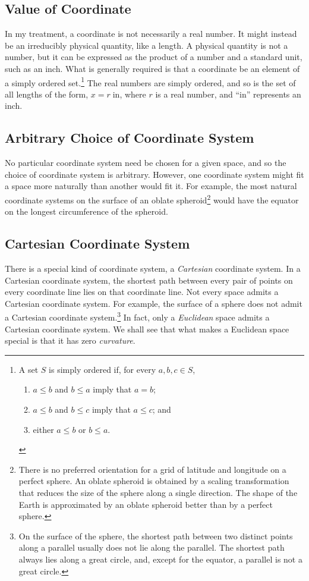 \subsection{Value of Coordinate}

In my treatment, a coordinate is not necessarily a real number.  It might
instead be an irreducibly physical quantity, like a length.  A physical
quantity is not a number, but it can be expressed as the product of a number
and a standard unit, such as an inch.  What is generally required is that a
coordinate be an element of a simply ordered set.\footnote{%
   A set $S$ is simply ordered if, for every $a, b, c \in S$,
   \begin{enumerate}
      \item $a \leq b$ and $b \leq a$ imply that $a = b$;
      \item $a \leq b$ and $b \leq c$ imply that $a \leq c$; and
      \item either $a \leq b$ or $b \leq a$.
   \end{enumerate}%
}
The real numbers are simply ordered, and so is the set of all lengths of the
form, $x = r \; \text{in}$, where $r$ is a real number, and ``$\text{in}$''
represents an inch.

\subsection{Arbitrary Choice of Coordinate System}

No particular coordinate system need be chosen for a given space, and so the
choice of coordinate system is arbitrary.  However, one coordinate system might
fit a space more naturally than another would fit it.  For example, the most
natural coordinate systems on the surface of an oblate
spheroid\footnote[][-0.9in]{%
   There is no preferred orientation for a grid of latitude and longitude on a
   perfect sphere.  An oblate spheroid is obtained by a scaling transformation
   that reduces the size of the sphere along a single direction.  The shape of
   the Earth is approximated by an oblate spheroid better than by a perfect
   sphere.%
}
would have the equator on the longest circumference of the spheroid.

\subsection{Cartesian Coordinate System}

There is a special kind of coordinate system, a \emph{Cartesian} coordinate
system.  In a Cartesian coordinate system, the shortest path between every pair
of points on every coordinate line lies on that coordinate line.  Not every
space admits a Cartesian coordinate system.  For example, the surface of a
sphere does not admit a Cartesian coordinate system.\footnote{%
   On the surface of the sphere, the shortest path between two distinct points
   along a parallel usually does not lie along the parallel.  The shortest path
   always lies along a great circle, and, except for the equator, a parallel is
   not a great circle.%
}
In fact, only a \emph{Euclidean} space admits a Cartesian coordinate system.
We shall see that what makes a Euclidean space special is that it has zero
\emph{curvature}.

